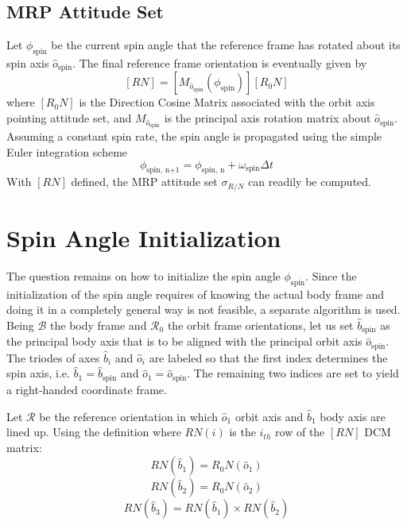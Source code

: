 \documentclass[]{AVSSimReportMemo}
\begin{document}
\subsection{MRP Attitude Set}
Let $\phi_{\textrm{spin}}$ be the current spin angle that the reference frame has rotated about its spin axis $\hat o_{\textrm{spin}}$. The final reference frame orientation is eventually given by
\begin{equation}
	\label{eq:dbeta}
	[RN] =  [M_{\hat{o}_{\textrm{spin}}} (\phi_{\textrm{spin}})][R_{0}N]
\end{equation}
where $[R_{0}N]$ is the Direction Cosine Matrix associated with the orbit axis pointing attitude set, and $M_{\hat{o}_{\textrm{spin}}}$ is the principal axis rotation matrix about $\hat o_{\textrm{spin}}$. Assuming a constant spin rate, the spin angle is propagated using the simple Euler integration scheme
\begin{equation}
	\label{eq:dbeta}
	\phi_{\textrm{spin, n+1}} = \phi_{\textrm{spin, n}} + \omega_{\textrm{spin}}\Delta t
\end{equation}
With $[RN]$ defined, the MRP attitude set $\sigma_{R/N}$ can readily be computed.

\section{Spin Angle Initialization}



The question remains on how to initialize the spin angle $\phi_{\textrm{spin}}$. Since the initialization of the spin angle requires of knowing the actual body frame and doing it in a completely general way is not feasible, a separate algorithm is used.
Being $\mathcal{B}$ the body frame and $\mathcal{R}_{0}$ the orbit frame orientations, let us set $\hat{b}_{\textrm{spin}}$ as the principal body axis that is to be aligned with the principal orbit axis $\hat{o}_{\textrm{spin}}$. The triodes of axes $\hat b_{i}$ and $\hat o_{i}$ are labeled so that the first index determines the spin axis, i.e. $\hat b_{1} =\hat b_{\textrm{spin}}$ and $\hat o_{1} =\hat o_{\textrm{spin}}$. The remaining two indices are set to yield a right-handed coordinate frame.\par

Let $\mathcal{R}$ be the reference orientation in which $\hat o_{1}$ orbit axis and $\hat b_{1}$ body axis are lined up. Using the definition where $RN(i)$ is the $i_{th}$ row of the $[RN]$ DCM matrix:
\begin{equation}
	\label{eq:dbeta}
	RN(\hat b_{1}) = R_{0}N(\hat o_{1}) 
\end{equation}
\begin{equation}
	\label{eq:dbeta}
	RN(\hat b_{2}) = R_{0}N(\hat o_{2}) 
\end{equation}
\begin{equation}
	\label{eq:dbeta}
	RN(\hat b_{3}) = RN(\hat b_{1}) \times RN(\hat b_{2})
\end{equation}
\end{document}
